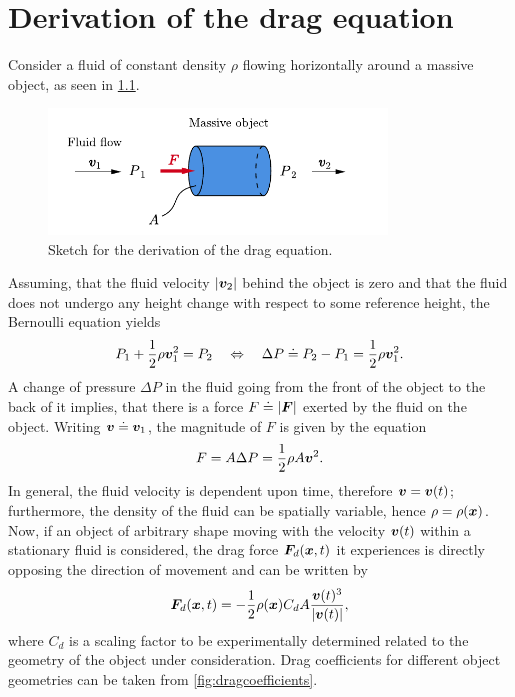 \documentclass[a4paper,11pt]{report}
\begin{document}
\chapter{Derivation of the drag equation}
Consider a fluid of constant density $\rho$ flowing horizontally around a massive object, as seen in \cref{fig:dragequationderivation}.
\begin{figure}[h]
\centering
\includegraphics[width=9cm]{figures/dragequationderivation.pdf}
\caption{Sketch for the derivation of the drag equation.}
\label{fig:dragequationderivation}
\end{figure}
Assuming, that the fluid velocity $|\bm{v}_2|$ behind the object is zero and that the fluid does not undergo any height change with respect to some reference height, the Bernoulli equation yields \begin{equation}
P_1 + \frac{1}{2}\rho \bm{v}_1^2 = P_2 \quad \Leftrightarrow \quad \Delta P \doteq P_2-P_1 = \frac{1}{2}\rho \bm{v}_1^2.
\end{equation} A change of pressure $\Delta P$ in the fluid going from the front of the object to the back of it implies, that there is a force $F \doteq |\bm{F}|$ exerted by the fluid on the object. Writing $\bm{v} \doteq \bm{v}_1$, the magnitude of $F$ is given by the equation \begin{equation}
F = A \Delta P = \frac{1}{2}\rho A \bm{v}^2.
\end{equation} In general, the fluid velocity is dependent upon time, therefore $\bm{v} = \bm{v}(t)$; furthermore, the density of the fluid can be spatially variable, hence $\rho = \rho(\bm{x})$. Now, if an object of arbitrary shape moving with the velocity $\bm{v}(t)$ within a stationary fluid is considered, the drag force $\bm{F}_d(\bm{x},t)$ it experiences is directly opposing the direction of movement and can be written by \begin{equation}
\bm{F}_d(\bm{x},t) = - \frac{1}{2}\rho(\bm{x})C_d A \frac{\bm{v}(t)^3}{|\bm{v}(t)|},
\end{equation} where $C_d$ is a scaling factor to be experimentally determined related to the geometry of the object under consideration. Drag coefficients for different object geometries can be taken from \cref{fig:dragcoefficients}.
\end{document}
